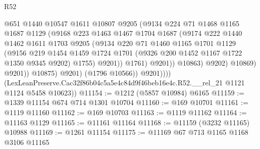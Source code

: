 \begin{lexlean}{R52}
\begin{coremodule}
                                @651
                                @1440
                                @10547
                                @1611
                                @10807
                                @9205
                                (@9134
                                  @224
                                  @71
                                  @1468
                                  @1165
                                  @1687
                                  @1129
                                  (@9168
                                    @223
                                    @1463
                                    @1467
                                    @1704
                                    @1687
                                    (@9174
                                      @222
                                      @1440
                                      @1462
                                      @1611
                                      @1703
                                      @9205
                                      (@9134
                                        @220
                                        @71
                                        @1460
                                        @1165
                                        @1701
                                        @1129
                                        (@9156
                                          @219
                                          @1454
                                          @1459
                                          @1724
                                          @1701
                                          (@9326 @200 @1452 @1167 @1722 @1350 @9345 @9202)
                                          @1755)
                                        @9201))
                                    @1761)
                                  @9201))
                              @10863)
                            @9202)
                          @10869)
                        @9201))
                    @10875)
                  @9201)
                (@1796 @10566))
              @9201))))
      (LexLeanPreserve.Cac32f86b04c5a5e4c84d9f46beb16e4c.R52.__rel_21 @1121 @1124 @5458 @10623))
@11154 := @1212 (@5857 @10984) @6165
@11159 := @1339 @11154 @674 @714 @1301 @10704
@11160 := @169 @10701
@11161 := @1119 @11160
@11162 := @169 @10703
@11163 := @1119 @11162
@11164 := @11163 @1129
@11165 := @11161 @11164
@11168 := @11159 (@3232 @11165) @10988
@11169 := @1261 @11154
@11175 := @11169 @67 @713 @1165 @1168 @3106 @11165

\end{coremodule}
\end{lexlean}
